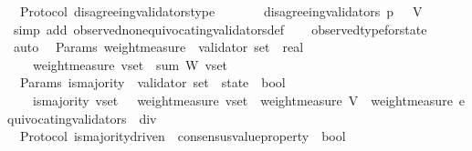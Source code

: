 \begin{isabellebody}
\isanewline
{}\isamarkupfalse%
\ {\isacharparenleft}\ Protocol{\isacharparenright}\ disagreeing{\isacharunderscore}validators{\isacharunderscore}type\ {\isacharcolon}\isanewline
\ \ {\isachardoublequoteopen}{\isasymforall}\ {\isasymsigma}\ {\isasymin}\ {\isasymSigma}{\isachardot}\ disagreeing{\isacharunderscore}validators\ {\isacharparenleft}p{\isacharcomma}\ {\isasymsigma}{\isacharparenright}\ {\isasymsubseteq}\ V{\isachardoublequoteclose}\isanewline
%
\isadelimproof
\ \ %
\endisadelimproof
%
\isatagproof
{}\isamarkupfalse%
\ {\isacharparenleft}simp\ add{\isacharcolon}\ observed{\isacharunderscore}non{\isacharunderscore}equivocating{\isacharunderscore}validators{\isacharunderscore}def{\isacharparenright}\isanewline
\ \ \isamarkupfalse%
\ observed{\isacharunderscore}type{\isacharunderscore}for{\isacharunderscore}state\ \isamarkupfalse%
\ auto%
\endisatagproof
{\isafoldproof}%
%
\isadelimproof
\isanewline
%
\endisadelimproof
\isanewline
\isanewline
{}\isamarkupfalse%
\ {\isacharparenleft}\ Params{\isacharparenright}\ weight{\isacharunderscore}measure\ {\isacharcolon}{\isacharcolon}\ {\isachardoublequoteopen}validator\ set\ {\isasymRightarrow}\ real{\isachardoublequoteclose}\isanewline
\ \ \isanewline
\ \ \ \ {\isachardoublequoteopen}weight{\isacharunderscore}measure\ v{\isacharunderscore}set\ {\isacharequal}\ sum\ W\ v{\isacharunderscore}set{\isachardoublequoteclose}\isanewline
\isanewline
\isanewline
{}\isamarkupfalse%
\ {\isacharparenleft}\ Params{\isacharparenright}\ is{\isacharunderscore}majority\ {\isacharcolon}{\isacharcolon}\ {\isachardoublequoteopen}{\isacharparenleft}validator\ set\ {\isacharasterisk}\ state{\isacharparenright}\ {\isasymRightarrow}\ bool{\isachardoublequoteclose}\isanewline
\ \ \isanewline
\ \ \ \ {\isachardoublequoteopen}is{\isacharunderscore}majority\ {\isacharparenleft}v{\isacharunderscore}set{\isacharcomma}\ {\isasymsigma}{\isacharparenright}\ {\isacharequal}\ {\isacharparenleft}weight{\isacharunderscore}measure\ v{\isacharunderscore}set\ {\isachargreater}\ {\isacharparenleft}weight{\isacharunderscore}measure\ V\ {\isacharminus}\ weight{\isacharunderscore}measure\ {\isacharparenleft}equivocating{\isacharunderscore}validators\ {\isasymsigma}{\isacharparenright}{\isacharparenright}\ div\ {}{\isacharparenright}{\isachardoublequoteclose}\isanewline
\ \ \ \isanewline
\isanewline
{}\isamarkupfalse%
\ {\isacharparenleft}\ Protocol{\isacharparenright}\ is{\isacharunderscore}majority{\isacharunderscore}driven\ {\isacharcolon}{\isacharcolon}\ {\isachardoublequoteopen}consensus{\isacharunderscore}value{\isacharunderscore}property\ {\isasymRightarrow}\ bool{\isachardoublequoteclose}\isanewline

\end{isabellebody}
